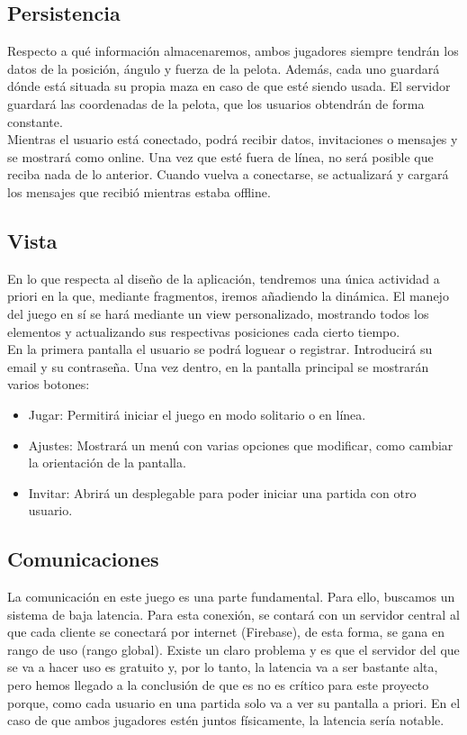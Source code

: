 \documentclass[a4paper,openright,12pt]{article}
\begin{document}
\subsection{Persistencia}
Respecto a qué información almacenaremos, ambos jugadores siempre tendrán los datos de la posición, ángulo y fuerza de la pelota. Además, cada uno guardará dónde está situada su propia maza en caso de que esté siendo usada. El servidor guardará las coordenadas de la pelota, que los usuarios obtendrán de forma constante. \\
Mientras el usuario está conectado, podrá recibir datos, invitaciones o mensajes y se mostrará como online. Una vez que esté fuera de línea, no será posible que reciba nada de lo anterior. Cuando vuelva a conectarse, se actualizará y cargará los mensajes que recibió mientras estaba offline.

\subsection{Vista}
En lo que respecta al diseño de la aplicación, tendremos una única actividad a priori en la que, mediante fragmentos, iremos añadiendo la dinámica. El manejo del juego en sí se hará mediante un view personalizado, mostrando todos los elementos y actualizando sus respectivas posiciones cada cierto tiempo. \\
En la primera pantalla el usuario se podrá loguear o registrar. Introducirá su email y su contraseña. Una vez dentro, en la pantalla principal se mostrarán varios botones: 
\begin{itemize}
    \item Jugar: Permitirá iniciar el juego en modo solitario o en línea.
    \item Ajustes: Mostrará un menú con varias opciones que modificar, como cambiar la orientación de la pantalla.
    \item Invitar: Abrirá un desplegable para poder iniciar una partida con otro usuario.
\end{itemize}


\subsection{Comunicaciones}
La comunicación en este juego es una parte fundamental. Para ello, buscamos un sistema de baja latencia. Para esta conexión, se contará con un servidor central al que cada cliente se conectará por internet (Firebase), de esta forma, se gana en rango de uso (rango global). Existe un claro problema y es que el servidor del que se va a hacer uso es gratuito y, por lo tanto, la latencia va a ser bastante alta, pero hemos llegado a la conclusión de que es no es crítico para este proyecto porque, como cada usuario en una partida solo va a ver su pantalla a priori. En el caso de que ambos jugadores estén juntos físicamente, la latencia sería notable.
\end{document}
